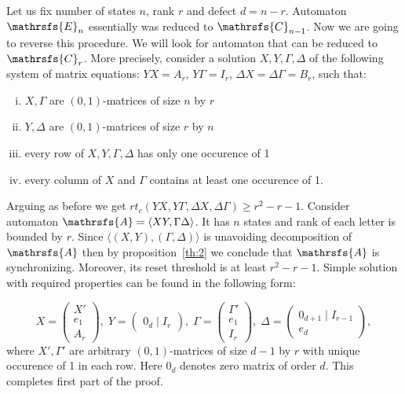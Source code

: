 \documentclass[11pt]{llncs}
\newcommand{\A}{\mathrsfs{A}}
\newcommand{\G}{\Gamma}
\newcommand{\D}{\Delta}
\newcommand{\rtc}{rt_{c}}
\begin{document}
Let us fix number of states $n$, rank $r$ and defect $d = n - r$. Automaton $\mathrsfs{E}_n$ essentially was reduced to $\mathrsfs{C}_{n - 1}$.
Now we are going to reverse this procedure. We will look for automaton that can be reduced to $\mathrsfs{C}_r$.
More precisely, consider a solution $X,Y,\G,\D$ of the following system of matrix equations:
$YX = A_{r}$, $Y\G = I_{r}$, $\D X = \D \G = B_{r}$, such that:
\begin{enumerate}[(i)]
\item $X,\G$ are $(0,1)$-matrices of size $n$ by $r$
\item $Y,\D$ are $(0,1)$-matrices of size $r$ by $n$
\item every row of $X, Y, \G, \D$ has only one occurence of 1
\item every column of $X$ and $\G$ contains at least one occurence of 1.
\end{enumerate}
Arguing as before we get $\rtc(YX, Y\G, \D X, \D \G) \geq r^2 - r - 1$.
Consider automaton $\A = \langle XY, \G\D \rangle$. It has $n$ states and rank of each letter is bounded by $r$.
Since $\langle (X,Y), (\G, \D) \rangle$ is unavoiding decomposition of $\A$ then by proposition~\ref{th:2} we 
conclude that $\A$ is synchronizing.
Moreover, its reset threshold is at least $r^2 - r - 1$.
Simple solution with required properties can be found in the following form:

$$
X =
\left(
\begin{array}{c}
X' \\
e_1 \\
A_r
\end{array}
\right),\;
Y = 
\left(
\begin{array}{c}
0_d \mid I_r
\end{array}
\right),\;
\G = 
\left(
\begin{array}{c}
\G' \\
e_1 \\
I_r
\end{array}
\right),\;
\D = 
\left(
\begin{array}{c}
0_{d + 1} \mid I_{r-1}\\ \hline
e_d
\end{array}
\right),
$$
where $X', \G'$ are arbitrary $(0,1)$-matrices of size $d-1$ by $r$ with unique occurence of 1
in each row. Here $0_{d}$ denotes zero matrix of order $d$. This completes first part of the proof.
\end{document}
